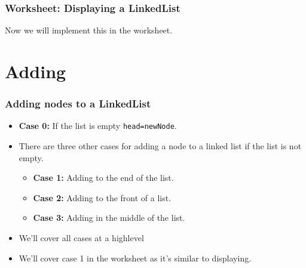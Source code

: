 \documentclass{beamer}
\begin{document}
%
%
%
%


\begin{frame}
    \frametitle{Worksheet: Displaying a LinkedList}
    \vfill
    \centering
    Now we will implement this in the worksheet.
    \vfill
\end{frame}



\section{Adding}
\begin{frame}
    \frametitle{Adding nodes to a LinkedList}
    \vfill
    \begin{itemize}
        \item \textbf{Case 0:} If the list is empty \lstinline|head=newNode|.
        \item There are three other cases for adding a node to a linked list if the list is not empty.
            \begin{itemize}
                \item \textbf{Case 1:} Adding to the end of the list.
                \item \textbf{Case 2:} Adding to the front of a list.
                \item \textbf{Case 3:} Adding in the middle of the list.
            \end{itemize}
        \item We'll cover all cases at a highlevel
        \item We'll cover case 1 in the worksheet as it's similar to displaying.
    \end{itemize}
    \vfill
\end{frame}
\end{document}
